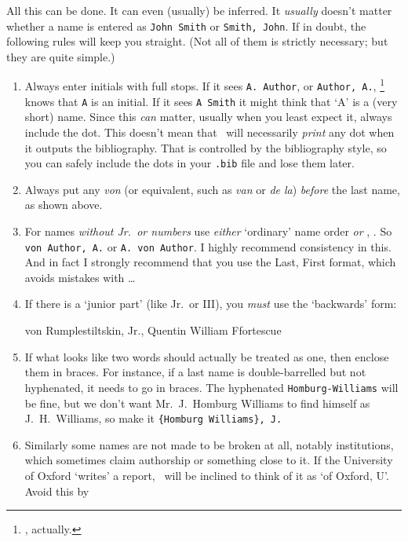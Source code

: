 All this can be done. It can even (usually) be inferred. It
\emph{usually} doesn't matter whether a name is entered as
\verb|John Smith| or \verb|Smith, John|. If in doubt, the following
rules will keep you straight. (Not all of them is strictly necessary;
but they are quite simple.)

\begin{enumerate}
\item Always enter initials with full stops. If it sees
  \verb|A. Author|, or \verb|Author, A.|,
  \biblatex\footnote{, actually.} knows that \verb|A|
  is an initial. If it sees \verb|A Smith| it might think that `A' is
  a (very short) name. Since this \emph{can} matter, usually when you
  least expect it, always include the dot. This doesn't mean that
  \biblatex\ will necessarily \emph{print} any dot when it outputs
  the bibliography. That is controlled by the bibliography style, so
  you can safely include the dots in your \verb|.bib| file and lose
  them later.
\item Always put any \emph{von} (or equivalent, such as \emph{van} or
  \emph{de la}) \emph{before} the last name, as shown above.
\item For names \emph{without Jr.\ or numbers} use \emph{either}
  `ordinary' name order \emph{or} , . So \verb|von Author, A.| or
  \verb|A. von Author|. I highly recommend consistency in this. And in
  fact I strongly recommend that you use the Last, First format, which
  avoids mistakes with \ldots
\item If there is a `junior part' (like Jr.\ or III), you \emph{must}
  use the `backwards' form:\begin{center}von Rumplestiltskin, Jr.,
    Quentin William Ffortescue\end{center}
\item If what looks like two words should actually be treated as one,
  then enclose them in braces. For instance, if a last name is
  double-barrelled but not hyphenated, it needs to go in braces. The
  hyphenated \verb|Homburg-Williams| will be fine, but we don't want
  Mr.~J.\ Homburg Williams to find himself as J.\ H.~Williams, so make
  it \verb|{Homburg Williams}, J.|
\item Similarly some names are not made to be broken at all, notably
  institutions, which sometimes claim authorship or something close to
  it. If the University of Oxford `writes' a report, \biblatex\ will
  be inclined to think of it as `of Oxford, U'. Avoid this by

\end{enumerate}

